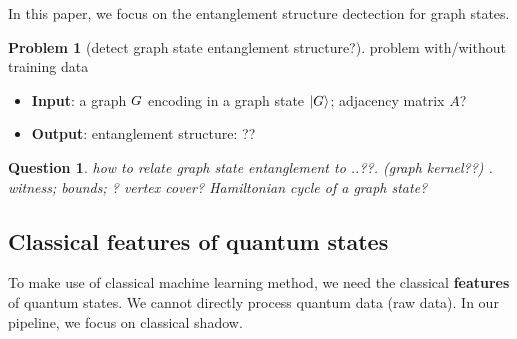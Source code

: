 \documentclass[
10pt,
aps,
pra,
linenumbers,
floatfix,
]{revtex4-2}
\theoremstyle{plain}
\newtheorem{question}{Question}
\theoremstyle{definition}
\newtheorem{problem}{Problem}
\begin{document}
In this paper, we focus on the entanglement structure dectection for graph states.
\begin{problem}[detect graph state entanglement structure?]
	problem with/without training data
	\begin{itemize}
		\item \textbf{Input}: a graph $G$ encoding in a graph state $\ket{G}$;
		adjacency matrix $A$?
		\item \textbf{Output}: entanglement structure: \textsf{}??
	\end{itemize}
\end{problem}
\begin{question}
	how to relate graph state entanglement to 
	..??. (graph kernel??)
	\cite{heinEntanglementGraphStates2006}.
	witness; bounds; ? vertex cover?
	Hamiltonian cycle of a graph state? 
\end{question} 


\subsection{Classical features of quantum states}
To make use of classical machine learning method, we need the classical \textbf{features} of quantum states.
We cannot directly process quantum data (raw data).
In our pipeline, we focus on classical shadow.
\end{document}
